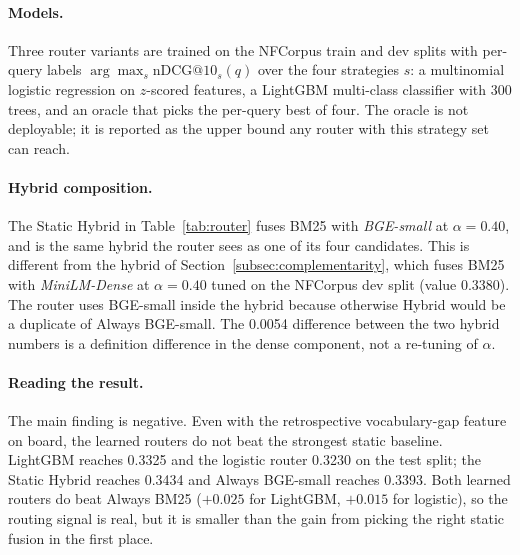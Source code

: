 \documentclass[11pt,a4paper]{article}
\begin{document}
\paragraph{Models.}
Three router variants are trained on the NFCorpus train and dev splits
with per-query labels $\arg\max_s \text{nDCG@10}_s(q)$ over the four
strategies $s$: a multinomial logistic regression on $z$-scored
features, a LightGBM multi-class classifier with 300 trees, and an
oracle that picks the per-query best of four. The oracle is not
deployable; it is reported as the upper bound any router with this
strategy set can reach.

\begin{table}[ht]
    \centering
    \caption{Query-routing evaluation on the NFCorpus test split. The
    Always-baselines reproduce the strongest single retriever and the
    static hybrid; the Always BGE-small + BGE-reranker baseline comes
    from Section~\ref{subsec:reranker}; the Oracle row is the per-query
    best-of-four upper bound.}
    \label{tab:router}
    \small
    
\end{table}

\paragraph{Hybrid composition.}
The Static Hybrid in Table~\ref{tab:router} fuses BM25 with
\emph{BGE-small} at $\alpha = 0.40$, and is the same hybrid the router
sees as one of its four candidates. This is different from the hybrid
of Section~\ref{subsec:complementarity}, which fuses BM25 with
\emph{MiniLM-Dense} at $\alpha = 0.40$ tuned on the NFCorpus dev split
(value 0.3380). The router uses BGE-small inside the hybrid because
otherwise Hybrid would be a duplicate of Always BGE-small. The
0.0054 difference between the two hybrid numbers is a definition
difference in the dense component, not a re-tuning of $\alpha$.

\paragraph{Reading the result.}
The main finding is negative. Even with the retrospective
vocabulary-gap feature on board, the learned routers do not beat the
strongest static baseline. LightGBM reaches 0.3325 and the logistic
router 0.3230 on the test split; the Static Hybrid reaches 0.3434
and Always BGE-small reaches 0.3393. Both learned routers do beat
Always BM25 ($+0.025$ for LightGBM, $+0.015$ for logistic), so the
routing signal is real, but it is smaller than the gain from picking
the right static fusion in the first place.
\end{document}
